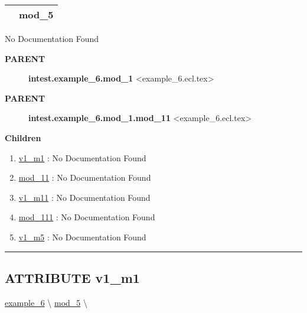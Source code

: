 {\renewcommand{\arraystretch}{1.5}
\begin{tabularx}{\textwidth}{|>{\raggedright\arraybackslash}l|X|}
\hline
\hspace{0pt}\mytexttt{\color{red} } & \textbf{mod\_5} \\
\hline
\end{tabularx}
}

\par





No Documentation Found










\par
\begin{description}
\item [\colorbox{tagtype}{\color{white} \textbf{\textsf{PARENT}}}] \textbf{intest.example\_6.mod\_1} <example\_6.ecl.tex>
\item [\colorbox{tagtype}{\color{white} \textbf{\textsf{PARENT}}}] \textbf{intest.example\_6.mod\_1.mod\_11} <example\_6.ecl.tex>
\end{description}


\textbf{Children}
\begin{enumerate}
\item \hyperlink{ecldoc:intest.example_6.mod_1.v1_m1}{v1\_m1}
: No Documentation Found
\item \hyperlink{ecldoc:intest.example_6.mod_1.mod_11}{mod\_11}
: No Documentation Found
\item \hyperlink{ecldoc:intest.example_6.mod_1.mod_11.v1_m11}{v1\_m11}
: No Documentation Found
\item \hyperlink{ecldoc:intest.example_6.mod_1.mod_11.mod_111}{mod\_111}
: No Documentation Found
\item \hyperlink{ecldoc:intest.example_6.mod_5.v1_m5}{v1\_m5}
: No Documentation Found
\end{enumerate}

\rule{\linewidth}{0.5pt}

\subsection*{\textsf{\colorbox{headtoc}{\color{white} ATTRIBUTE}
v1\_m1}}

\hypertarget{ecldoc:intest.example_6.mod_1.v1_m1}{}
\hspace{0pt} \hyperlink{ecldoc:intest.example_6}{example_6} \textbackslash 
\hspace{0pt} \hyperlink{ecldoc:intest.example_6.mod_5}{mod_5} \textbackslash 

